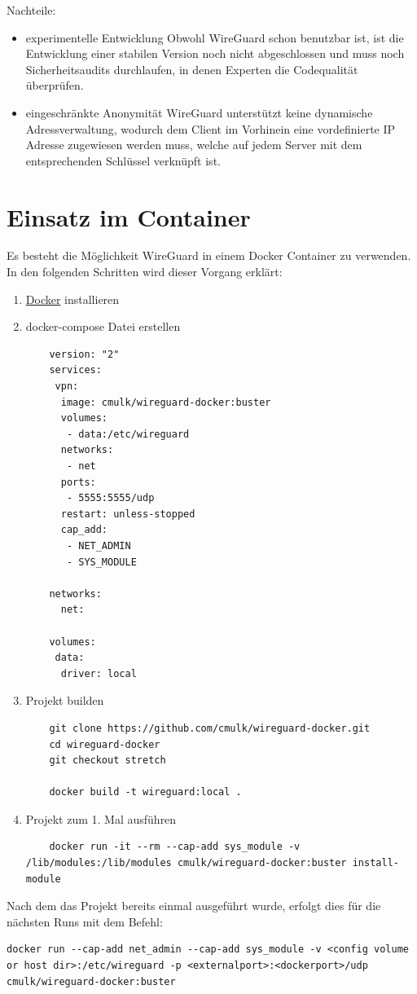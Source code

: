 Nachteile:
\begin{itemize}
    \item experimentelle Entwicklung \newline
    Obwohl WireGuard schon benutzbar ist, ist die Entwicklung einer stabilen Version noch nicht abgeschlossen und muss noch Sicherheitsaudits durchlaufen, in denen Experten die Codequalität überprüfen.
    \item eingeschränkte Anonymität \newline
    WireGuard unterstützt keine dynamische Adressverwaltung, wodurch dem Client im Vorhinein eine vordefinierte IP Adresse zugewiesen werden muss, welche auf jedem Server mit dem entsprechenden Schlüssel verknüpft ist.
\end{itemize}
\newpage
\section{Einsatz im Container}
Es besteht die Möglichkeit WireGuard in einem Docker Container zu verwenden. In den folgenden Schritten wird dieser Vorgang erklärt:
\begin{enumerate}
    \item \href{https://docs.docker.com/docker-for-windows/install/}{Docker} installieren
    \item docker-compose Datei erstellen \newline
    \begin{lstlisting}
    version: "2"
    services:
     vpn:
      image: cmulk/wireguard-docker:buster
      volumes:
       - data:/etc/wireguard
      networks:
       - net
      ports:
       - 5555:5555/udp
      restart: unless-stopped
      cap_add:
       - NET_ADMIN
       - SYS_MODULE
    
    networks:
      net:
    
    volumes:
     data:
      driver: local
    \end{lstlisting}
    \item Projekt builden
    \begin{lstlisting}
    git clone https://github.com/cmulk/wireguard-docker.git
    cd wireguard-docker
    git checkout stretch 
    
    docker build -t wireguard:local .
    \end{lstlisting}
    \item Projekt zum 1. Mal ausführen
    \begin{lstlisting}
    docker run -it --rm --cap-add sys_module -v /lib/modules:/lib/modules cmulk/wireguard-docker:buster install-module 
    \end{lstlisting}
\end{enumerate}
Nach dem das Projekt bereits einmal ausgeführt wurde, erfolgt dies für die nächsten Runs mit dem Befehl:
\begin{lstlisting}
docker run --cap-add net_admin --cap-add sys_module -v <config volume or host dir>:/etc/wireguard -p <externalport>:<dockerport>/udp cmulk/wireguard-docker:buster
\end{lstlisting}

